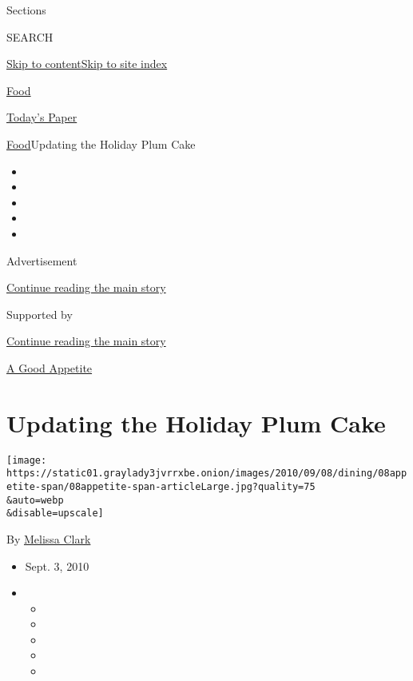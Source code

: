 Sections

SEARCH

\protect\hyperlink{site-content}{Skip to
content}\protect\hyperlink{site-index}{Skip to site index}

\href{https://www.nytimes3xbfgragh.onion/section/food}{Food}

\href{https://myaccount.nytimes3xbfgragh.onion/auth/login?response_type=cookie\&client_id=vi}{}

\href{https://www.nytimes3xbfgragh.onion/section/todayspaper}{Today's
Paper}

\href{/section/food}{Food}\textbar{}Updating the Holiday Plum Cake

\begin{itemize}
\item
\item
\item
\item
\item
\end{itemize}

Advertisement

\protect\hyperlink{after-top}{Continue reading the main story}

Supported by

\protect\hyperlink{after-sponsor}{Continue reading the main story}

\href{/column/a-good-appetite}{A Good Appetite}

\hypertarget{updating-the-holiday-plum-cake}{%
\section{Updating the Holiday Plum
Cake}\label{updating-the-holiday-plum-cake}}

\texttt{[image: https://static01.graylady3jvrrxbe.onion/images/2010/09/08/dining/08appetite-span/08appetite-span-articleLarge.jpg?quality=75\\\&auto=webp\\\&disable=upscale]}

By \href{https://www.nytimes3xbfgragh.onion/by/melissa-clark}{Melissa
Clark}

\begin{itemize}
\item
  Sept. 3, 2010
\item
  \begin{itemize}
  \item
  \item
  \item
  \item
  \item
  \end{itemize}
\end{itemize}

